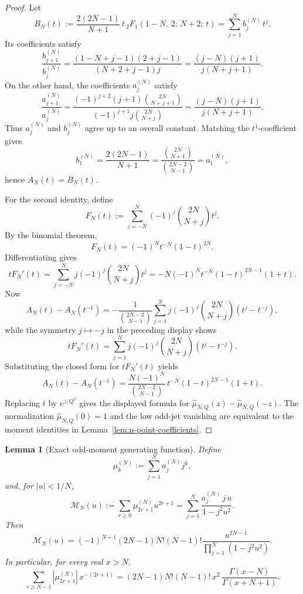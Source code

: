 \documentclass[11pt,a4paper]{amsart}
\theoremstyle{plain}
\newtheorem{lemma}[theorem]{Lemma}
\theoremstyle{definition}
\begin{document}
\begin{proof}
Let
\[
B_N(t):=
\frac{2(2N-1)}{N+1}\,
t\,{}_2F_1(1-N,\,2;\,N+2;\,t)
=
\sum_{j=1}^N b_j^{(N)}\,t^j.
\]
Its coefficients satisfy
\[
\frac{b_{j+1}^{(N)}}{b_j^{(N)}}
=
\frac{(1-N+j-1)(2+j-1)}{(N+2+j-1)j}
=
\frac{(j-N)(j+1)}{j(N+j+1)}.
\]
On the other hand, the coefficients $a_j^{(N)}$ satisfy
\[
\frac{a_{j+1}^{(N)}}{a_j^{(N)}}
=
\frac{(-1)^{j+2}(j+1)\binom{2N}{N+j+1}}
     {(-1)^{j+1}j\binom{2N}{N+j}}
=
\frac{(j-N)(j+1)}{j(N+j+1)}.
\]
Thus $a_j^{(N)}$ and $b_j^{(N)}$ agree up to an overall constant.  Matching
the $t^1$-coefficient gives
\[
b_1^{(N)}
=
\frac{2(2N-1)}{N+1}
=
\frac{\binom{2N}{N+1}}{\binom{2N-2}{N-1}}
=
a_1^{(N)},
\]
hence $A_N(t)=B_N(t)$.

For the second identity, define
\[
F_N(t):=\sum_{j=-N}^{N}(-1)^j\binom{2N}{N+j}t^j.
\]
By the binomial theorem,
\[
F_N(t)=(-1)^N t^{-N}(1-t)^{2N}.
\]
Differentiating gives
\[
tF_N'(t)
=
\sum_{j=-N}^{N}j(-1)^j\binom{2N}{N+j}t^j
=
-N(-1)^N t^{-N}(1-t)^{2N-1}(1+t).
\]
Now
\[
A_N(t)-A_N(t^{-1})
=
-\frac{1}{\binom{2N-2}{N-1}}
\sum_{j=1}^N j(-1)^j\binom{2N}{N+j}(t^j-t^{-j}),
\]
while the symmetry $j\mapsto -j$ in the preceding display shows
\[
tF_N'(t)
=
\sum_{j=1}^N j(-1)^j\binom{2N}{N+j}(t^j-t^{-j}).
\]
Substituting the closed form for $tF_N'(t)$ yields
\[
A_N(t)-A_N(t^{-1})
=
\frac{N(-1)^N}{\binom{2N-2}{N-1}}\,
t^{-N}(1-t)^{2N-1}(1+t).
\]
Replacing $t$ by $e^{z/Q^2}$ gives the displayed formula for
$\widehat\mu_{N,Q}(z)-\widehat\mu_{N,Q}(-z)$.  The normalization
$\widehat\mu_{N,Q}(0)=1$ and the low odd-jet vanishing are equivalent to the
moment identities in Lemma~\ref{lem:n-point-coefficients}.
\end{proof}

\begin{lemma}[Exact odd-moment generating function]
\label{lem:n-point-odd-generating-function}
Define
\[
\mu_k^{(N)}:=\sum_{j=1}^N a_j^{(N)}j^k,
\]
and, for $|u|<1/N$,
\[
\mathcal M_N(u)
:=
\sum_{r\ge 0}\mu_{2r+1}^{(N)}u^{2r+1}
=
\sum_{j=1}^N \frac{a_j^{(N)}\,j\,u}{1-j^2u^2}.
\]
Then
\[
\mathcal M_N(u)
=
(-1)^{N+1}(2N-1)N!(N-1)!
\frac{u^{2N-1}}{\prod_{j=1}^N(1-j^2u^2)}.
\]
In particular, for every real $x>N$,
\[
\sum_{r\ge N-1} |\mu_{2r+1}^{(N)}|\,x^{-(2r+1)}
=
(2N-1)N!(N-1)!\,x^2\,
\frac{\Gamma(x-N)}{\Gamma(x+N+1)}.
\]
\end{lemma}
\end{document}
